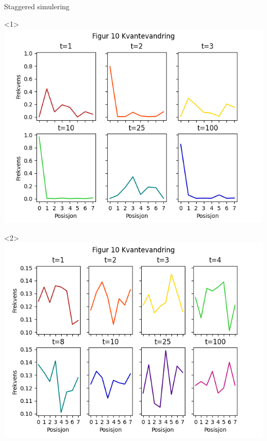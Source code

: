 \documentclass[norsk]{beamer}
\begin{document}
	\begin{frame}{Staggered simulering}
			\begin{onlyenv}<1>
				\includegraphics[scale = 0.5]{Fig10Start0.png}
			\end{onlyenv}
			\begin{onlyenv}<2>
				\includegraphics[scale = 0.5]{Fig10Hadamard.png}
			\end{onlyenv}
	\end{frame}
\end{document}
